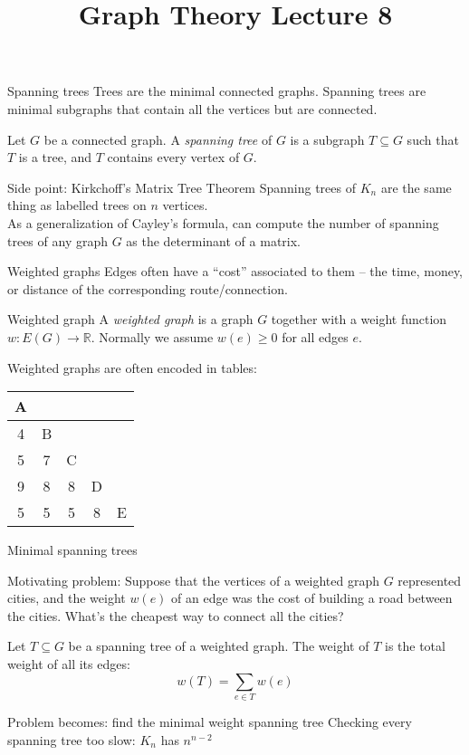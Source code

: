 \documentclass{beamer}
\title{Graph Theory Lecture 8}
\begin{document}
\begin{frame}{Spanning trees}
Trees are the minimal connected graphs.  Spanning trees are minimal subgraphs that contain all the vertices but are connected.
  \begin{definition}Let $G$ be a connected graph.  A \emph{spanning tree} of $G$ is a subgraph $T\subseteq G$ such that $T$ is a tree, and $T$ contains every vertex of $G$.
    \end{definition}
  \begin{block}{Side point: Kirkchoff's Matrix Tree Theorem}
    Spanning trees of $K_n$ are the same thing as labelled trees on $n$ vertices. \\
As a generalization of Cayley's formula, can compute the number of spanning trees of any graph $G$ as the determinant of a matrix.
    \end{block}

\end{frame}

\begin{frame}{Weighted graphs}
Edges often have a ``cost'' associated to them -- the time, money, or distance of the corresponding route/connection.

  \begin{definition}{Weighted graph}
    A \emph{weighted graph} is a graph $G$ together with a weight function $w:E(G)\to \mathbb{R}.$  Normally we assume $w(e)\geq 0$ for all edges $e$.
  \end{definition}

  Weighted graphs are often encoded in tables: 
\begin{center}
  \begin{tabular}{c|c|c|c|c}
    A &   &   &   &   \\ \hline
    4 & B &   &   &   \\ \hline
    5 & 7 & C &   &   \\ \hline
    9 & 8 & 8 & D &   \\ \hline
    5 & 5 & 5 & 8 & E \\
    \end{tabular}
  \end{center}
  \end{frame}

\begin{frame}{Minimal spanning trees}
\begin{block}{Motivating problem:}
  Suppose that the vertices of a weighted graph $G$ represented cities, and the weight $w(e)$ of an edge was the cost of building a road between the cities.  What's the cheapest way to connect all the cities?
\end{block}
  \begin{definition} Let $T\subseteq G$ be a spanning tree of a weighted graph.  The weight of $T$ is the total weight of all its edges:
    $$w(T)=\sum_{e\in T}w(e)$$
 \end{definition}
  \begin{block}{Problem becomes: find the minimal weight spanning tree}
    Checking every spanning tree too slow: $K_n$ has $n^{n-2}$
    \end{block}
\end{frame}
\end{document}
